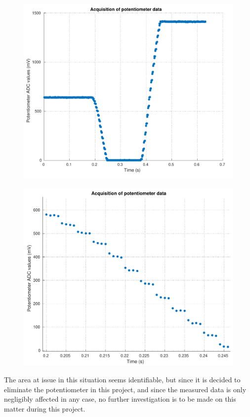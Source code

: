 \begin{minipage}{0.45\linewidth}
  \begin{figure}[H]
    \includegraphics[scale=.42]{figures/potMeterJumps1}
    \captionsetup{justification=centering}
    \label{fig:potMeterJumps1}
  \end{figure}\vspace{-5mm}
\end{minipage}
\hspace{0.03\linewidth}
\begin{minipage}{0.45\linewidth}
  \begin{figure}[H]\vspace{-1.5mm}
    \includegraphics[scale=.42]{figures/potMeterJumps2}
    \captionsetup{justification=centering}
    \label{fig:potMeterJumps2}
  \end{figure}\vspace{-5mm}
\end{minipage}

The area at issue in this situation seems identifiable, but since it is decided to eliminate the potentiometer in this project, and since the measured data is only negligibly affected in any case, no further investigation is to be made on this matter during this project.